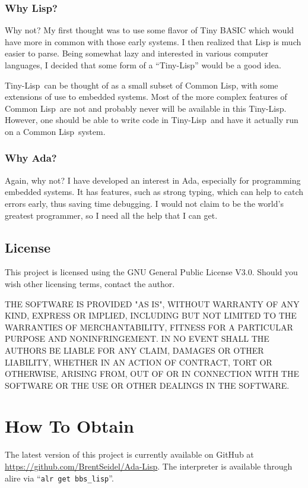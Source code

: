 \documentclass[10pt, openany]{book}
\newcommand{\keyword}[1]{\texttt{#1}}
\newcommand{\tl}{Tiny-Lisp}
\newcommand{\cl}{Common Lisp}
\begin{document}
\subsection{Why Lisp?}
Why not?  My first thought was to use some flavor of Tiny BASIC which would have more in common with those early systems.  I then realized that Lisp is much easier to parse.  Being somewhat lazy and interested in various computer languages, I decided that some form of a ``\tl'' would be a good idea.

\tl\ can be thought of as a small subset of \cl, with some extensions of use to embedded systems.  Most of the more complex features of \cl\ are not and probably never will be available in this \tl.  However, one should be able to write code in \tl\ and have it actually run on a \cl\ system.

\subsection{Why Ada?}
Again, why not?  I have developed an interest in Ada, especially for programming embedded systems.  It has features, such as strong typing, which can help to catch errors early, thus saving time debugging.  I would not claim to be the world's greatest programmer, so I need all the help that I can get.

\section{License}
This project is licensed using the GNU General Public License V3.0.  Should you wish other licensing terms, contact the author.

THE SOFTWARE IS PROVIDED "AS IS", WITHOUT WARRANTY OF ANY KIND, EXPRESS OR IMPLIED, INCLUDING BUT NOT LIMITED TO THE WARRANTIES OF MERCHANTABILITY, FITNESS FOR A PARTICULAR PURPOSE AND NONINFRINGEMENT. IN NO EVENT SHALL THE AUTHORS BE LIABLE FOR ANY CLAIM, DAMAGES OR OTHER LIABILITY, WHETHER IN AN ACTION OF CONTRACT, TORT OR OTHERWISE, ARISING FROM, OUT OF OR IN CONNECTION WITH THE SOFTWARE OR THE USE OR OTHER DEALINGS IN THE SOFTWARE.

\chapter{How To Obtain}
The latest version of this project is currently available on GitHub at \url{https://github.com/BrentSeidel/Ada-Lisp}.  The interpreter is available through alire via ``\keyword{alr get bbs\_lisp}''.
\end{document}
